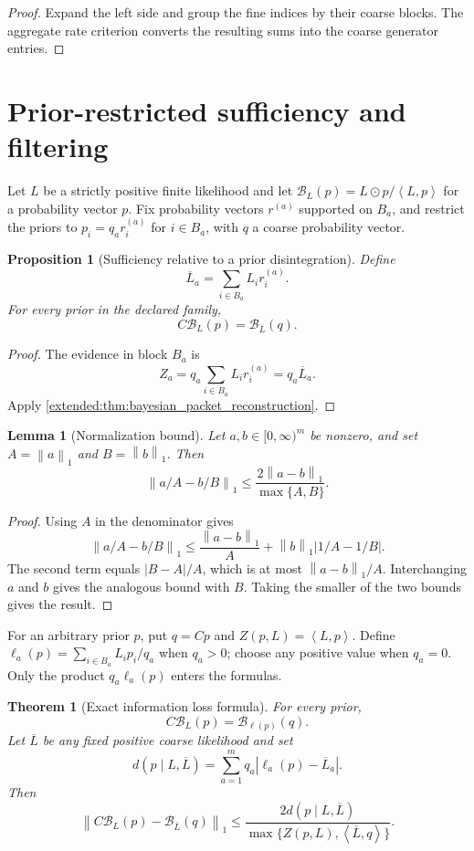 \documentclass[11pt,letterpaper]{article}
\newtheorem{theorem}{Theorem}[section]
\theoremstyle{plain}
\newtheorem{proposition}[proposition]{Proposition}
\theoremstyle{plain}
\newtheorem{lemma}[lemma]{Lemma}
\theoremstyle{plain}
\theoremstyle{definition}
\theoremstyle{definition}
\theoremstyle{definition}
\theoremstyle{definition}
\theoremstyle{definition}
\theoremstyle{remark}
\theoremstyle{remark}
\theoremstyle{remark}
\theoremstyle{remark}
\theoremstyle{remark}
\newcommand{\norm}[1]{\left\lVert#1\right\rVert}
\theoremstyle{remark}
\newcommand{\Bcal}{\mathcal B}
\newcommand{\abs}[1]{\left\lvert#1\right\rvert}
\newcommand{\ip}[2]{\left\langle#1,#2\right\rangle}
\let\KomorebiPrimitiveMathcal\mathcal
\renewcommand{\mathcal}[1]{{\KomorebiPrimitiveMathcal{#1}}}
\begin{document}
\begin{proof}
Expand the left side and group the fine indices by their coarse blocks. The aggregate rate criterion converts the resulting sums into the coarse generator entries.
\end{proof}


\FloatBarrier
\section{Prior-restricted sufficiency and filtering}\label{earlier:section:03}
Let $L$ be a strictly positive finite likelihood and let $\Bcal_L(p)=L\odot p/\ip{L}{p}$ for a probability vector $p$. Fix probability vectors $r^{(a)}$ supported on $B_a$, and restrict the priors to $p_i=q_a r_i^{(a)}$ for $i\in B_a$, with $q$ a coarse probability vector.
\begin{proposition}[Sufficiency relative to a prior disintegration]\label{earlier:record:011}\label{earlier:prop:relative_sufficiency}
Define
\[
\overline L_a
=
\sum_{i\in B_a}L_ir_i^{(a)}.
\]
For every prior in the declared family,
\[
C\Bcal_L(p)
=
\Bcal_{\overline L}(q).
\]
\end{proposition}

\begin{proof}
The evidence in block \(B_a\) is
\[
Z_a
=q_a\sum_{i\in B_a}L_ir_i^{(a)}
=q_a\overline L_a.
\]
Apply \cref{extended:thm:bayesian_packet_reconstruction}.
\end{proof}

\begin{lemma}[Normalization bound]\label{earlier:record:012}\label{earlier:lem:normalization_bound}
Let \(a,b\in[0,\infty)^m\) be nonzero, and set \(A=\norm a_1\) and \(B=\norm b_1\). Then
\[
\boxed{
\norm{a/A-b/B}_1
\leq
\frac{2\norm{a-b}_1}{\max\{A,B\}}.
}
\]
\end{lemma}

\begin{proof}
Using \(A\) in the denominator gives
\[
\norm{a/A-b/B}_1
\leq
\frac{\norm{a-b}_1}{A}
+
\norm b_1\abs{1/A-1/B}.
\]
The second term equals \(\abs{B-A}/A\), which is at most \(\norm{a-b}_1/A\). Interchanging \(a\) and \(b\) gives the analogous bound with \(B\). Taking the smaller of the two bounds gives the result.
\end{proof}


For an arbitrary prior $p$, put $q=Cp$ and $Z(p,L)=\ip{L}{p}$. Define $\ell_a(p)=\sum_{i\in B_a}L_ip_i/q_a$ when $q_a>0$; choose any positive value when $q_a=0$. Only the product $q_a\ell_a(p)$ enters the formulas.
\begin{theorem}[Exact information loss formula]\label{earlier:record:013}\label{earlier:thm:information_loss}
For every prior,
\[
\boxed{
C\Bcal_L(p)
=
\Bcal_{\ell(p)}(q).
}
\]
Let \(\overline L\) be any fixed positive coarse likelihood and set
\[
d(p\mid L,\overline L)
=
\sum_{a=1}^mq_a\abs{\ell_a(p)-\overline L_a}.
\]
Then
\[
\norm{
C\Bcal_L(p)-\Bcal_{\overline L}(q)
}_1
\leq
\frac{2d(p\mid L,\overline L)}
{\max\{Z(p,L),\ip{\overline L}{q}\}}.
\]
\end{theorem}
\end{document}

